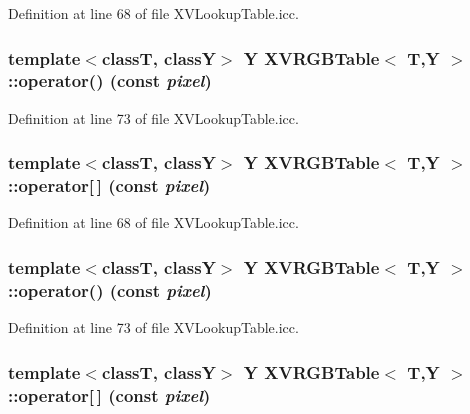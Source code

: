 Definition at line 68 of file XVLookup\-Table.icc.\label{XVRGBTable_a5}
\hypertarget{class_XVRGBTable_a5}{
\subsubsection[operator()]{\setlength{\rightskip}{0pt plus 5cm}template$<$classT, classY$>$ Y XVRGBTable$<$ T,Y $>$::operator() (const {\em pixel})}}




Definition at line 73 of file XVLookup\-Table.icc.\label{XVRGBTable_a6}
\hypertarget{class_XVRGBTable_a6}{
\subsubsection[operator{}]{\setlength{\rightskip}{0pt plus 5cm}template$<$classT, classY$>$ Y XVRGBTable$<$ T,Y $>$::operator\mbox{[}$\,$\mbox{]} (const {\em pixel})}}




Definition at line 68 of file XVLookup\-Table.icc.\label{XVRGBTable_a7}
\hypertarget{class_XVRGBTable_a7}{
\subsubsection[operator()]{\setlength{\rightskip}{0pt plus 5cm}template$<$classT, classY$>$ Y XVRGBTable$<$ T,Y $>$::operator() (const {\em pixel})}}




Definition at line 73 of file XVLookup\-Table.icc.\label{XVRGBTable_a8}
\hypertarget{class_XVRGBTable_a8}{
\subsubsection[operator{}]{\setlength{\rightskip}{0pt plus 5cm}template$<$classT, classY$>$ Y XVRGBTable$<$ T,Y $>$::operator\mbox{[}$\,$\mbox{]} (const {\em pixel})}}




